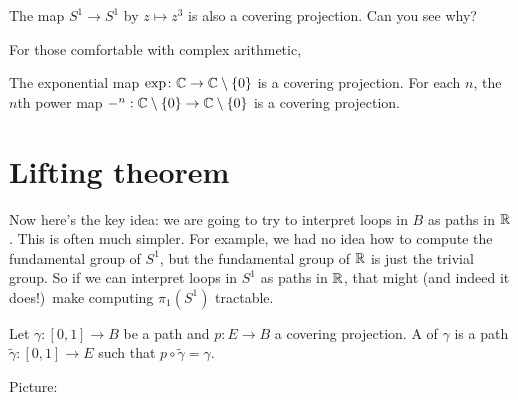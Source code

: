 \begin{example}
	The map $S^1 \to S^1$ by
	$z \mapsto z^{3}$ is also a covering projection.
	Can you see why?
\end{example}

\begin{example}
	For those comfortable with complex arithmetic,
	\begin{enumerate}[(a)]
		\ii The exponential map $\exp \colon \mathbb C \to \mathbb C \setminus \{0\}$
		is a covering projection.
		\ii For each $n$, the $n$th power map
		$-^n: \mathbb C \setminus \{0\} \to \mathbb C \setminus \{0\}$
		is a covering projection.
	\end{enumerate}
\end{example}

\section{Lifting theorem}
\label{sec:lifting_thm}
Now here's the key idea: we are going to try to interpret
loops in $B$ as paths in $\mathbb R$.
This is often much simpler.
For example, we had no idea how to compute the fundamental group of $S^1$,
but the fundamental group of $\mathbb R$ is just the trivial group.
So if we can interpret loops in $S^1$ as paths in $\mathbb R$,
that might (and indeed it does!)\ make computing $\pi_1(S^1)$ tractable.

\begin{definition}
	Let $\gamma \colon [0,1] \to B$ be a path and $p \colon E \to B$ a covering projection.
	A  of $\gamma$ is a path $\tilde\gamma \colon [0,1] \to E$
	such that $p \circ \tilde\gamma = \gamma$.
\end{definition}
Picture:
\begin{center}
\end{center}



